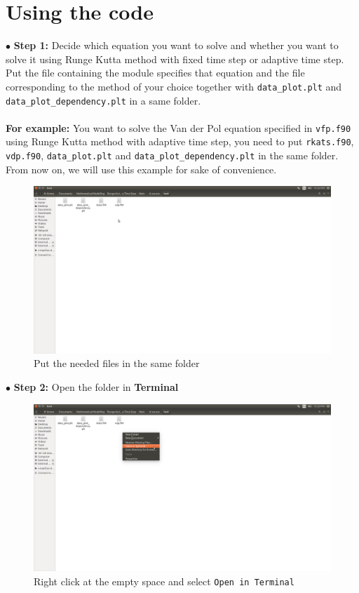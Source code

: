 \documentclass[a4paper,oneside]{book}
\numberwithin{equation}{chapter}
\begin{document}
	\section{Using the code}
	$\bullet$ \textbf{Step 1:} Decide which equation you want to solve and whether you want to solve it using Runge Kutta method with fixed time step or adaptive time step. Put the file containing the module specifies that equation and the file corresponding to the method of your choice together with \texttt{data\_plot.plt} and \texttt{data\_plot\_dependency.plt} in a same folder.\\\\
	\textbf{For example:} You want to solve the Van der Pol equation specified in \texttt{vfp.f90} using Runge Kutta method with adaptive time step, you need to put \texttt{rkats.f90}, \texttt{vdp.f90}, \texttt{data\_plot.plt} and \texttt{data\_plot\_dependency.plt} in the same folder. From now on, we will use this example for sake of convenience.
	\begin{figure}[H]
		\centering	\includegraphics[width=15cm]{fig1}
		\caption{Put the needed files in the same folder}
	\end{figure}
	\noindent$\bullet$ \textbf{Step 2:} Open the folder in \textbf{Terminal}
	\begin{figure}[H]
		\centering	\includegraphics[width=15cm]{fig2}
		\caption{Right click at the empty space and select \texttt{Open in Terminal}}
	\end{figure}
\end{document}
